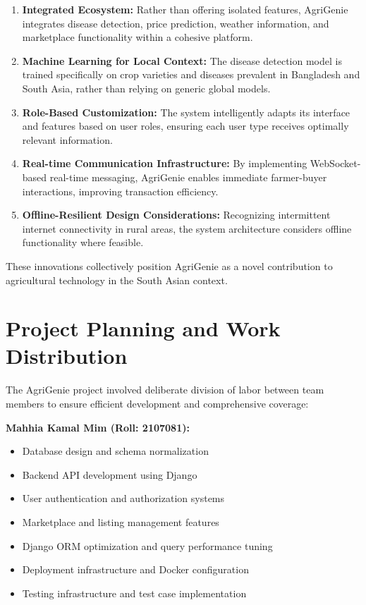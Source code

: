 \documentclass[12pt,a4paper]{report}
\begin{document}
\begin{enumerate}
    \item \textbf{Integrated Ecosystem:} Rather than offering isolated features, AgriGenie integrates disease detection, price prediction, weather information, and marketplace functionality within a cohesive platform.
    
    \item \textbf{Machine Learning for Local Context:} The disease detection model is trained specifically on crop varieties and diseases prevalent in Bangladesh and South Asia, rather than relying on generic global models.
    
    \item \textbf{Role-Based Customization:} The system intelligently adapts its interface and features based on user roles, ensuring each user type receives optimally relevant information.
    
    \item \textbf{Real-time Communication Infrastructure:} By implementing WebSocket-based real-time messaging, AgriGenie enables immediate farmer-buyer interactions, improving transaction efficiency.
    
    \item \textbf{Offline-Resilient Design Considerations:} Recognizing intermittent internet connectivity in rural areas, the system architecture considers offline functionality where feasible.
\end{enumerate}

These innovations collectively position AgriGenie as a novel contribution to agricultural technology in the South Asian context.

\section{Project Planning and Work Distribution}

The AgriGenie project involved deliberate division of labor between team members to ensure efficient development and comprehensive coverage:

\textbf{Mahhia Kamal Mim (Roll: 2107081):}
\begin{itemize}
    \item Database design and schema normalization
    \item Backend API development using Django
    \item User authentication and authorization systems
    \item Marketplace and listing management features
    \item Django ORM optimization and query performance tuning
    \item Deployment infrastructure and Docker configuration
    \item Testing infrastructure and test case implementation
\end{itemize}
\end{document}
